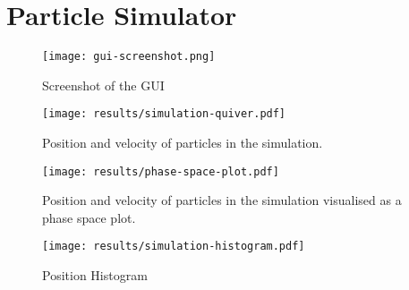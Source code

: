 \chapter{Particle Simulator}
\label{chap:particle-simulator}




\begin{figure}[H]
  \centering
  \label{fig:gui-screenshot}
  \texttt{[image: gui-screenshot.png]}
  \caption{Screenshot of the GUI}
\end{figure}

\begin{figure}[H]
  \centering
  \label{fig:simulation-quiver}
  \texttt{[image: results/simulation-quiver.pdf]}
  \caption{Position and velocity of particles in the simulation.}
\end{figure}

\begin{figure}[H]
  \centering
  \label{fig:phase-space-plot}
  \texttt{[image: results/phase-space-plot.pdf]}
  \caption{Position and velocity of particles in the simulation visualised as a phase space plot.}
\end{figure}

\begin{figure}[H]
  \centering
  \label{fig:simulation-histogram}
  \texttt{[image: results/simulation-histogram.pdf]}
  \caption{Position Histogram}
\end{figure}
